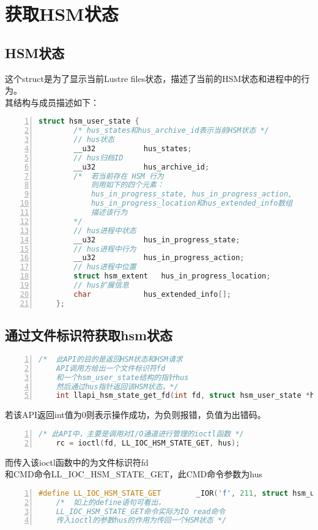 \section{获取HSM状态}

\subsection{HSM状态}
这个struct是为了显示当前Lustre files状态，描述了当前的HSM状态和进程中的行为。\\
其结构与成员描述如下：
\begin{lstlisting}[language={c++},numbers=left]
	struct hsm_user_state {
		/* hus_states和hus_archive_id表示当前HSM状态 */
		// hus状态
		__u32			hus_states;     
		// hus归档ID
		__u32			hus_archive_id; 
		/*  若当前存在 HSM 行为 
			则用如下的四个元素：
			hus_in_progress_state, hus_in_progress_action,
			hus_in_progress_location和hus_extended_info数组
			描述该行为
		*/
		// hus进程中状态
		__u32			hus_in_progress_state;  
		// hus进程中行为
		__u32			hus_in_progress_action; 
		// hus进程中位置
		struct hsm_extent	hus_in_progress_location;   
		// hus扩展信息
		char			hus_extended_info[];    
	};
\end{lstlisting}


\subsection{通过文件标识符获取hsm状态}
\begin{lstlisting}[language={c++},numbers=left]
    /*  此API的目的是返回HSM状态和HSM请求
    API调用方给出一个文件标识符fd
    和一个hsm_user_state结构的指针hus
    然后通过hus指针返回该HSM状态。*/
    int llapi_hsm_state_get_fd(int fd, struct hsm_user_state *hus);
\end{lstlisting}

若该API返回int值为0则表示操作成功，为负则报错，负值为出错码。

\begin{lstlisting}[language={c++},numbers=left]
    /* 此API中，主要是调用对I/O通道进行管理的ioctl函数 */
    rc = ioctl(fd, LL_IOC_HSM_STATE_GET, hus);
\end{lstlisting}

而传入该ioctl函数中的为文件标识符fd\\和CMD命令LL\_IOC\_HSM\_STATE\_GET，此CMD命令参数为hus
\begin{lstlisting}[language={c++},numbers=left]
    #define LL_IOC_HSM_STATE_GET		_IOR('f', 211, struct hsm_user_state)
    /*  如上的define语句可看出，
    LL_IOC_HSM_STATE_GET命令实际为IO read命令
    传入ioctl的参数hus的作用为传回一个HSM状态 */
\end{lstlisting}


